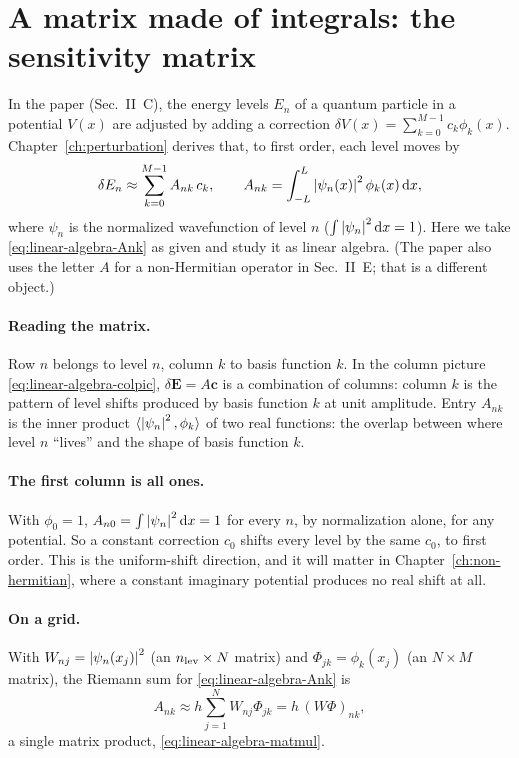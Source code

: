 \section{A matrix made of integrals: the sensitivity matrix}\label{sec:linear-algebra-sens}

In the paper (Sec.~II~C), the energy levels $E_n$ of a quantum particle in a potential $V(x)$ are adjusted by adding a correction $\delta V(x)=\sum_{k=0}^{M-1}c_k\phi_k(x)$. Chapter~\ref{ch:perturbation} derives that, to first order, each level moves by
\begin{equation}
\delta E_n\approx\sum_{k=0}^{M-1}A_{nk}\,c_k,\qquad A_{nk}=\int_{-L}^{L}\left\lvert \psi_n(x)\right\rvert^2\phi_k(x)\,\mathrm{d} x ,
\label{eq:linear-algebra-Ank}
\end{equation}
where $\psi_n$ is the normalized wavefunction of level $n$ ($\int\left\lvert \psi_n\right\rvert^2\mathrm{d} x=1$). Here we take \cref{eq:linear-algebra-Ank} as given and study it as linear algebra. (The paper also uses the letter $A$ for a non-Hermitian operator in Sec.~II~E; that is a different object.)

\paragraph{Reading the matrix.} Row $n$ belongs to level $n$, column $k$ to basis function $k$. In the column picture \cref{eq:linear-algebra-colpic}, $\delta\bm E=A\bm c$ is a combination of columns: column $k$ is the pattern of level shifts produced by basis function $k$ at unit amplitude. Entry $A_{nk}$ is the inner product $\langle\left\lvert \psi_n\right\rvert^2,\phi_k\rangle$ of two real functions: the overlap between where level $n$ ``lives'' and the shape of basis function $k$.

\paragraph{The first column is all ones.} With $\phi_0=1$, $A_{n0}=\int\left\lvert \psi_n\right\rvert^2\mathrm{d} x=1$ for every $n$, by normalization alone, for any potential. So a constant correction $c_0$ shifts every level by the same $c_0$, to first order. This is the uniform-shift direction, and it will matter in Chapter~\ref{ch:non-hermitian}, where a constant imaginary potential produces no real shift at all.

\paragraph{On a grid.} With $W_{nj}=\left\lvert \psi_n(x_j)\right\rvert^2$ (an $n_{\rm lev}\times N$ matrix) and $\Phi_{jk}=\phi_k(x_j)$ (an $N\times M$ matrix), the Riemann sum for \cref{eq:linear-algebra-Ank} is
\begin{equation}
A_{nk}\approx h\sum_{j=1}^NW_{nj}\Phi_{jk}=h\,(W\Phi)_{nk},
\label{eq:linear-algebra-AWPhi}
\end{equation}
a single matrix product, \cref{eq:linear-algebra-matmul}.

